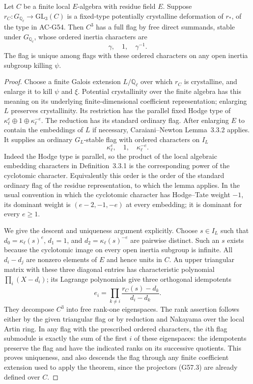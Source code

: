 \begin{lemma}
\label{AC-G57-Artin}
Let $C$ be a finite local $E$-algebra with residue field $E$.
Suppose $r_C:G_{\mathbb Q_\ell}\to\mathrm{GL}_3(C)$
is a fixed-type potentially crystalline deformation of
$r_*$, of the type in AC-G54.
Then $C^3$ has a full flag by free direct summands,
stable under $G_{\mathbb Q_\ell}$, whose ordered
inertia characters are
\[
                    \gamma,\quad1,\quad\gamma^{-1}.
                                                               \tag{G57.1}
\]
The flag is unique among flags with these ordered
characters on any open inertia subgroup killing $\psi$.
\end{lemma}
\begin{proof}
Choose a finite Galois extension $L/\mathbb Q_\ell$
over which $r_C$ is crystalline, and enlarge it to
kill $\psi$ and $\xi$.  Potential crystallinity over
the finite algebra has this meaning on its underlying
finite-dimensional coefficient representation; enlarging
$L$ preserves crystallinity.  Its restriction has the
parallel fixed Hodge type of
$\kappa_\ell^e\oplus1\oplus\kappa_\ell^{-e}$.
The reduction has its standard ordinary flag.
After enlarging $E$ to contain the embeddings of $L$
if necessary, Caraiani--Newton Lemma~3.3.2 applies.
It supplies an ordinary $G_L$-stable flag with
ordered characters on $I_L$
\[
                  \kappa_\ell^e,\quad1,\quad\kappa_\ell^{-e}.
                                                               \tag{G57.2}
\]
Indeed the Hodge type is parallel, so the product of
the local algebraic embedding characters in
Definition~3.3.1 is the corresponding power of the
cyclotomic character.  Equivalently this order is the
order of the standard ordinary flag of the residue
representation, to which the lemma applies.  In the
usual convention in which the cyclotomic character has
Hodge--Tate weight $-1$, its dominant weight is
$(e-2,-1,-e)$ at every embedding; it is dominant for
every $e\geq1$.

We give the descent and uniqueness argument explicitly.
Choose $s\in I_L$ such that
$d_0=\kappa_\ell(s)^e$, $d_1=1$, and
$d_2=\kappa_\ell(s)^{-e}$ are pairwise distinct.
Such an $s$ exists because the cyclotomic image on
every open inertia subgroup is infinite.
All $d_i-d_j$ are nonzero elements of $E$ and hence
units in $C$.  An upper triangular matrix with these
three diagonal entries has characteristic polynomial
$\prod_i(X-d_i)$; its Lagrange polynomials give three
orthogonal idempotents
\[
             e_i=\prod_{k\ne i}\frac{r_C(s)-d_k}{d_i-d_k}.
                                                               \tag{G57.3}
\]
They decompose $C^3$ into free rank-one eigenspaces.
The rank assertion follows either by the given triangular
flag or by reduction and Nakayama over the local Artin
ring.  In any flag with the prescribed ordered
characters, the $i$th flag submodule is exactly the sum
of the first $i$ of these eigenspaces: the idempotents
preserve the flag and have the indicated ranks on its
successive quotients.  This proves uniqueness, and also
descends the flag through any finite coefficient
extension used to apply the theorem, since the
projectors (G57.3) are already defined over $C$.


\end{proof}
